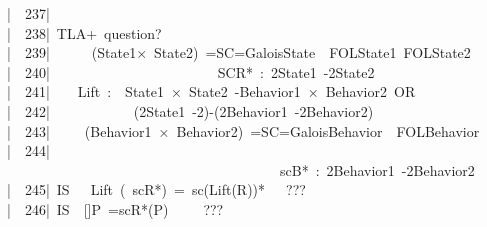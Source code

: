 \documentclass{article}
\newcommand{\syntaxCOMMENTC}[1]{\textcolor[rgb]{0.4,0.0,0.8}{#1}}
\newcommand{\syntaxCOMMENTC}[1]{\textcolor[rgb]{0.4,0.0,0.8}{#1}}
\newcommand{\syntaxCOMMENTC}[1]{\textcolor[rgb]{0.4,0.0,0.8}{#1}}
\newcommand{\syntaxCOMMENTC}[1]{\textcolor[rgb]{0.4,0.0,0.8}{\textbf{#1}}}
\newcommand{\syntaxCOMMENTC}[1]{\textcolor[rgb]{0.4,0.0,0.8}{#1}}
\newcommand{\syntaxCOMMENTC}[1]{\textcolor[rgb]{0.4,0.0,0.8}{#1}}
\newcommand{\syntaxCOMMENTC}[1]{\textcolor[rgb]{0.0,0.0,0.0}{#1}}
\newcommand{\gutter}[1]{\textcolor[rgb]{0,0,0}{{|}#1}}
\newcommand{\gutterH}[1]{\textcolor[rgb]{1,0,0}{{|}#1}}
\begin{document}
\gutter{\ \ 237{|}\ }\hspace*{\fill}\\
\gutter{\ \ 238{|}\ }\syntaxCOMMENTC{TLA+{\ }question?}\hspace*{\fill}\\
\gutter{\ \ 239{|}\ }\syntaxCOMMENTC{{\ }{\ }{\ }{\ }{\ }(State1×{\ }State2){\ }=SC=\usebox{\greaterthan}{\ }Galois\usebox{\underscorebox}State{\ }{\ }FOL\usebox{\underscorebox}State1{\ }FOL\usebox{\underscorebox}State2}\hspace*{\fill}\\
\gutterH{\ \ 240{|}\ }\syntaxCOMMENTC{{\ }{\ }{\ }{\ }{\ }{\ }{\ }{\ }{\ }{\ }{\ }{\ }{\ }{\ }{\ }{\ }{\ }{\ }{\ }{\ }{\ }{\ }{\ }SC\usebox{\underscorebox}R*{\ }:{\ }2\usebox{\hatbox}State1{\ }{-}\usebox{\greaterthan}{\ }2\usebox{\hatbox}State2{\ }{\ }{\ }{\ }}\hspace*{\fill}\\
\gutter{\ \ 241{|}\ }\syntaxCOMMENTC{{\ }{\ }{\ }Lift{\ }:{\ }{\ }State1{\ }×{\ }State2{\ }{-}\usebox{\greaterthan}{\ }Behavior1{\ }×{\ }Behavior2{\ }OR{\ }{\ }}\hspace*{\fill}\\
\gutter{\ \ 242{|}\ }\syntaxCOMMENTC{{\ }{\ }{\ }{\ }{\ }{\ }{\ }{\ }{\ }{\ }{\ }(2\usebox{\hatbox}State1{\ }{-}\usebox{\greaterthan}{\ }{\ }2){-}\usebox{\greaterthan}{\ }(2\usebox{\hatbox}Behavior1{\ }{-}\usebox{\greaterthan}{\ }2\usebox{\hatbox}Behavior2){\ }}\hspace*{\fill}\\
\gutter{\ \ 243{|}\ }\syntaxCOMMENTC{{\ }{\ }{\ }{\ }(Behavior1{\ }×{\ }Behavior2){\ }=SC=\usebox{\greaterthan}{\ }Galois\usebox{\underscorebox}Behavior{\ }{\ }FOL\usebox{\underscorebox}Behavior}\hspace*{\fill}\\
\gutter{\ \ 244{|}\ }\syntaxCOMMENTC{{\ }{\ }{\ }{\ }{\ }{\ }{\ }{\ }{\ }{\ }{\ }{\ }{\ }{\ }{\ }{\ }{\ }{\ }{\ }{\ }{\ }{\ }{\ }{\ }{\ }{\ }{\ }{\ }{\ }{\ }{\ }{\ }{\ }{\ }{\ }{\ }{\ }{\ }sc\usebox{\underscorebox}B*{\ }:{\ }2\usebox{\hatbox}Behavior1{\ }{-}\usebox{\greaterthan}{\ }2\usebox{\hatbox}Behavior2}\hspace*{\fill}\\
\gutterH{\ \ 245{|}\ }\syntaxCOMMENTC{IS{\ }{\ }{\ }Lift{\ }({\ }sc\usebox{\underscorebox}R*){\ }={\ }sc\usebox{\underscorebox}(Lift(R))*{\ }{\ }{\ }???}\hspace*{\fill}\\
\gutter{\ \ 246{|}\ }\syntaxCOMMENTC{IS{\ }{\ }{[}{]}P{\ }=\usebox{\greaterthan}{\ }{\ }{[}{]}sc\usebox{\underscorebox}R*(P){\ }{\ }{\ }{\ }{\ }???}\hspace*{\fill}\\
\end{document}
